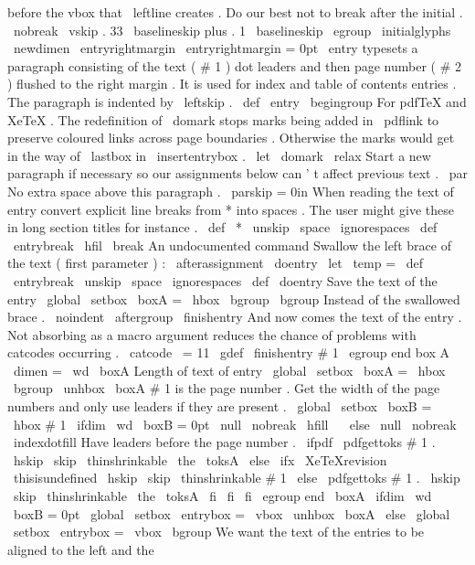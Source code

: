 {{{{before
the
vbox
that
%
\
leftline
creates
.
%
Do
our
best
not
to
break
after
the
initial
.
\
nobreak
\
vskip
.
33
\
baselineskip
plus
.
1
\
baselineskip
\
egroup
%
\
initialglyphs
}
\
newdimen
\
entryrightmargin
\
entryrightmargin
=
0pt
%
\
entry
typesets
a
paragraph
consisting
of
the
text
(
#
1
)
dot
leaders
and
%
then
page
number
(
#
2
)
flushed
to
the
right
margin
.
It
is
used
for
index
%
and
table
of
contents
entries
.
The
paragraph
is
indented
by
\
leftskip
.
%
\
def
\
entry
{
%
\
begingroup
%
%
For
pdfTeX
and
XeTeX
.
%
The
redefinition
of
\
domark
stops
marks
being
added
in
\
pdflink
to
%
preserve
coloured
links
across
page
boundaries
.
Otherwise
the
marks
%
would
get
in
the
way
of
\
lastbox
in
\
insertentrybox
.
\
let
\
domark
\
relax
%
%
Start
a
new
paragraph
if
necessary
so
our
assignments
below
can
'
t
%
affect
previous
text
.
\
par
%
%
No
extra
space
above
this
paragraph
.
\
parskip
=
0in
%
%
When
reading
the
text
of
entry
convert
explicit
line
breaks
%
from
*
into
spaces
.
The
user
might
give
these
in
long
section
%
titles
for
instance
.
\
def
\
*
{
\
unskip
\
space
\
ignorespaces
}
%
\
def
\
entrybreak
{
\
hfil
\
break
}
%
An
undocumented
command
%
%
Swallow
the
left
brace
of
the
text
(
first
parameter
)
:
\
afterassignment
\
doentry
\
let
\
temp
=
}
\
def
\
entrybreak
{
\
unskip
\
space
\
ignorespaces
}
%
\
def
\
doentry
{
%
%
Save
the
text
of
the
entry
\
global
\
setbox
\
boxA
=
\
hbox
\
bgroup
\
bgroup
%
Instead
of
the
swallowed
brace
.
\
noindent
\
aftergroup
\
finishentry
%
And
now
comes
the
text
of
the
entry
.
%
Not
absorbing
as
a
macro
argument
reduces
the
chance
of
problems
%
with
catcodes
occurring
.
}
{
\
catcode
\
=
11
\
gdef
\
finishentry
#
1
{
%
\
egroup
%
end
box
A
\
dimen
=
\
wd
\
boxA
%
Length
of
text
of
entry
\
global
\
setbox
\
boxA
=
\
hbox
\
bgroup
\
unhbox
\
boxA
%
#
1
is
the
page
number
.
%
%
Get
the
width
of
the
page
numbers
and
only
use
%
leaders
if
they
are
present
.
\
global
\
setbox
\
boxB
=
\
hbox
{
#
1
}
%
\
ifdim
\
wd
\
boxB
=
0pt
\
null
\
nobreak
\
hfill
\
%
\
else
%
\
null
\
nobreak
\
indexdotfill
%
Have
leaders
before
the
page
number
.
%
\
ifpdf
\
pdfgettoks
#
1
.
%
\
hskip
\
skip
\
thinshrinkable
\
the
\
toksA
\
else
\
ifx
\
XeTeXrevision
\
thisisundefined
\
hskip
\
skip
\
thinshrinkable
#
1
%
\
else
\
pdfgettoks
#
1
.
%
\
hskip
\
skip
\
thinshrinkable
\
the
\
toksA
\
fi
\
fi
\
fi
\
egroup
%
end
\
boxA
\
ifdim
\
wd
\
boxB
=
0pt
\
global
\
setbox
\
entrybox
=
\
vbox
{
\
unhbox
\
boxA
}
%
\
else
\
global
\
setbox
\
entrybox
=
\
vbox
\
bgroup
%
We
want
the
text
of
the
entries
to
be
aligned
to
the
left
and
the
%
}}}}}
